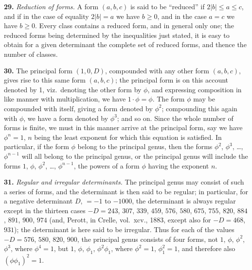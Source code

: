 \documentclass[11pt,a4paper]{article}
\begin{document}
\textbf{29.}\quad
\textit{Reduction of forms.} A form $(a, b, c)$ is said to be ``reduced'' if $2|b| \leq a \leq c$, and if in the case of equality $2|b| = a$ we have $b \geq 0$, and in the case $a = c$ we have $b \geq 0$. Every class contains a reduced form, and in general only one; the reduced forms being determined by the inequalities just stated, it is easy to obtain for a given determinant the complete set of reduced forms, and thence the number of classes.


\textbf{30.}\quad
The principal form $(1, 0, D)$, compounded with any other form $(a, b, c)$, gives rise to this same form $(a, b, c)$; the principal form is on this account denoted by 1, viz.\ denoting the other form by $\phi$, and expressing composition in like manner with multiplication, we have $1 \cdot \phi = \phi$. The form $\phi$ may be compounded with itself, giving a form denoted by $\phi^{2}$; compounding this again with $\phi$, we have a form denoted by $\phi^{3}$; and so on. Since the whole number of forms is finite, we must in this manner arrive at the principal form, say we have $\phi^{n} = 1$, $n$ being the least exponent for which this equation is satisfied. In particular, if the form $\phi$ belong to the principal genus, then the forms $\phi^{2}$, $\phi^{3}$, \ldots, $\phi^{n-1}$ will all belong to the principal genus, or the principal genus will include the forms $1$, $\phi$, $\phi^{2}$, \ldots, $\phi^{n-1}$, the powers of a form $\phi$ having the exponent $n$.

\textbf{31.}\quad
\textit{Regular and irregular determinants.} The principal genus may consist of such a series of forms, and the determinant is then said to be regular; in particular, for a negative determinant $D$, $= -1$ to $-1000$, the determinant is always regular except in the thirteen cases $-D = 243$, $307$, $339$, $459$, $576$, $580$, $675$, $755$, $820$, $884$, $891$, $900$, $974$ (and, Perott, in Crelle, vol.\ xcv., 1883, except also for $-D = 468$, $931$); the determinant is here said to be irregular. Thus for each of the values $-D = 576$, $580$, $820$, $900$, the principal genus consists of four forms, not $1$, $\phi$, $\phi^{2}$, $\phi^{3}$, where $\phi^{4} = 1$, but $1$, $\phi$, $\phi_{1}$, $\phi^{2}\phi_{1}$, where $\phi^{2} = 1$, $\phi_{1}^{2} = 1$, and therefore also $(\phi\phi_{1})^{2} = 1$.
\end{document}
